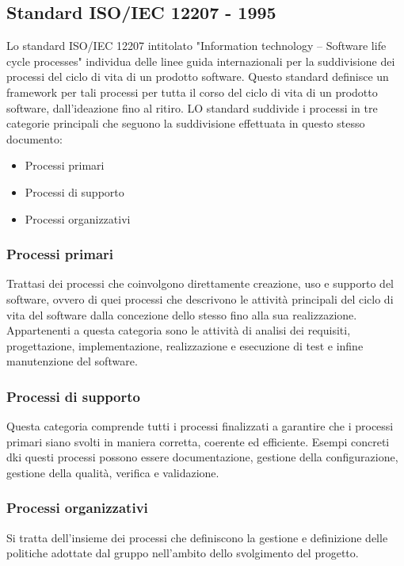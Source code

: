 \documentclass[10pt]{article}
\begin{document}
\begin{justify}
    \subsection{Standard ISO/IEC 12207 - 1995}
    \label{standard_12207}
    Lo standard ISO/IEC 12207 intitolato "Information technology – Software life cycle processes" individua delle linee guida internazionali
    per la suddivisione dei processi del ciclo di vita  di un prodotto software. Questo standard definisce un framework per tali processi
    per tutta il corso del ciclo di vita di un prodotto software, dall'ideazione fino al ritiro.
    LO standard suddivide i processi in tre categorie principali che seguono la suddivisione effettuata in questo stesso documento:
    \begin{itemize}
        \item Processi primari
        \item Processi di supporto
        \item Processi organizzativi
    \end{itemize}

        \subsubsection{Processi primari}
        Trattasi dei processi che coinvolgono direttamente creazione, uso e supporto del software, ovvero di quei processi che descrivono
        le attività principali del ciclo di vita del software dalla concezione dello stesso fino alla sua realizzazione. Appartenenti a questa 
        categoria sono le attività di analisi dei requisiti, progettazione, implementazione, realizzazione e esecuzione di test e infine 
        manutenzione del software.

        \subsubsection{Processi di supporto}
        Questa categoria comprende tutti i processi finalizzati a garantire che i processi primari siano svolti in maniera corretta, coerente ed
        efficiente. Esempi concreti dki questi processi possono essere documentazione, gestione della configurazione, gestione della qualità, 
        verifica e validazione.

        \subsubsection{Processi organizzativi}
        Si tratta dell'insieme dei processi che definiscono la gestione e definizione delle politiche adottate dal gruppo nell'ambito dello
        svolgimento del progetto.



\end{justify}
\end{document}
